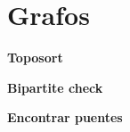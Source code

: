 \section{Grafos}
    \textbf{Toposort}
    

    \textbf{Bipartite check}
    

    \textbf{Encontrar puentes}
    